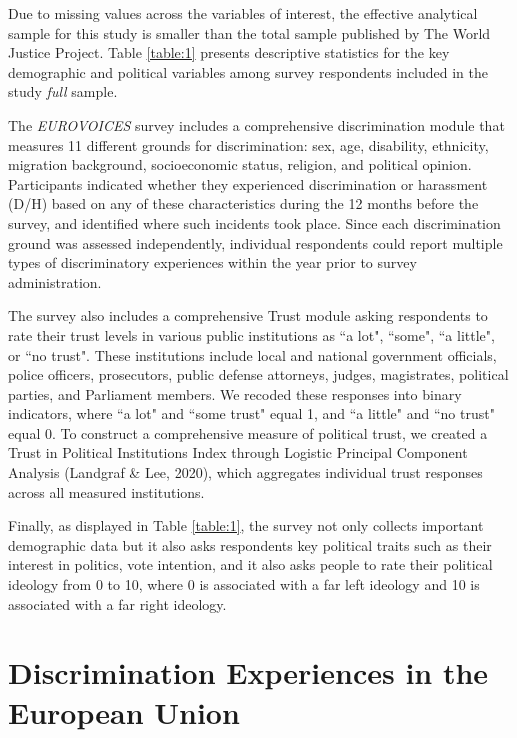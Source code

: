 \documentclass{article}
\begin{document}
Due to missing values across the variables of interest, the effective analytical sample for this study is smaller than the total sample published by The World Justice Project. Table \ref{table:1} presents descriptive statistics for the key demographic and political variables among survey respondents included in the study \emph{full} sample.



The \emph{EUROVOICES} survey includes a comprehensive discrimination module that measures 11 different grounds for discrimination: sex, age, disability, ethnicity, migration background, socioeconomic status, religion, and political opinion. Participants indicated whether they experienced discrimination or harassment (D/H) based on any of these characteristics during the 12 months before the survey, and identified where such incidents took place. Since each discrimination ground was assessed independently, individual respondents could report multiple types of discriminatory experiences within the year prior to survey administration.

The survey also includes a comprehensive Trust module asking respondents to rate their trust levels in various public institutions as ``a lot", ``some", ``a little", or ``no trust". These institutions include local and national government officials, police officers, prosecutors, public defense attorneys, judges, magistrates, political parties, and Parliament members. We recoded these responses into binary indicators, where ``a lot" and ``some trust" equal 1, and ``a little" and ``no trust" equal 0. To construct a comprehensive measure of political trust, we created a Trust in Political Institutions Index through Logistic Principal Component Analysis (Landgraf \& Lee, 2020), which aggregates individual trust responses across all measured institutions.

Finally, as displayed in Table \ref{table:1}, the survey not only collects important demographic data but it also asks respondents key political traits such as their interest in politics, vote intention, and it also asks people to rate their political ideology from 0 to 10, where 0 is associated with a far left ideology and 10 is associated with a far right ideology.

\section{Discrimination Experiences in the European Union}
\end{document}
